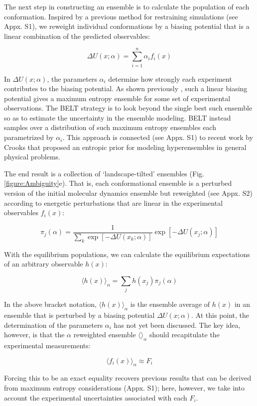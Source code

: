 \documentclass[journal=jacsat,manuscript=article]{achemso}
\begin{document}
The next step in constructing an ensemble is to calculate the population of each conformation.  Inspired by a previous method for restraining simulations  \cite{chodera2012} (see Appx. S1), we reweight individual conformations by a biasing potential that is a linear combination of the predicted observables:

$$\Delta U(x;\alpha) = \sum_{i=1}^n \alpha_i f_i(x)$$

In $\Delta U(x;\alpha)$, the parameters $\alpha_i$ determine how strongly each experiment contributes to the biasing potential.  As shown previously \cite{chodera2012}, such a linear biasing potential gives a maximum entropy ensemble for some set of experimental observations. The BELT strategy is to look beyond the single best such ensemble so as to estimate the uncertainty in the ensemble modeling. BELT instead samples over a distribution of such maximum entropy ensembles each parametrized by $\alpha_i$. This approach is connected (see Appx. S1) to recent work by Crooks that proposed an entropic prior for modeling hyperensembles in general physical problems. 

The end result is a collection of `landscape-tilted' ensembles (Fig. \ref{figure:Ambiguity}e). That is, each conformational ensemble is a perturbed version of the initial molecular dynamics ensemble but reweighted (see Appx. S2) according to energetic perturbations that are linear in the experimental observables $f_i(x)$:

$$\pi_j(\alpha) = \frac{1}{\sum_k \exp[-\Delta U(x_k;\alpha)]} \exp[-\Delta U(x_j;\alpha)]$$

With the equilibrium populations, we can calculate the equilibrium expectations of an arbitrary observable $h(x)$:

$$\langle h(x)\rangle _\alpha = \sum_j h(x_j) \pi_j(\alpha)$$

In the above bracket notation, $\langle h(x)\rangle _\alpha$ is the ensemble average of $h(x)$ in an ensemble that is perturbed by a biasing potential $\Delta U(x;\alpha)$.  At this point, the determination of the parameters $\alpha_i$ has not yet been discussed.  The key idea, however, is that the $\alpha$ reweighted ensemble $\langle \rangle _\alpha$ should recapitulate the experimental measurements:

$$\langle f_i(x)\rangle _\alpha \approx F_i$$

Forcing this to be an exact equality recovers previous results \cite{chodera2012} that can be derived from maximum entropy considerations (Appx. S1); here, however, we take into account the experimental uncertainties associated with each $F_i$.  
\end{document}
